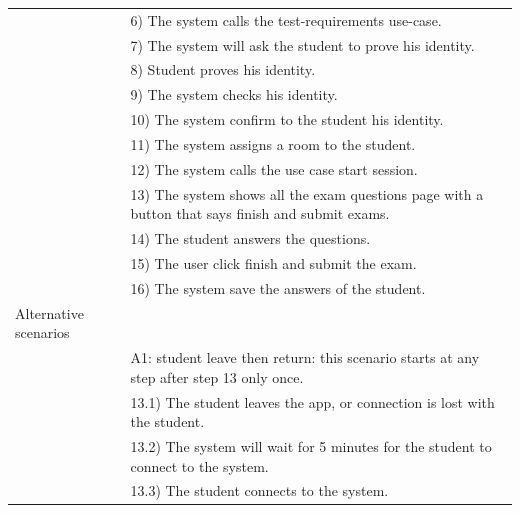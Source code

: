 \documentclass[]{uc2pfecaneva}
\begin{document}
\begin{table}[h]
\begin{tabularx}{\textwidth}{|l|X|}
		                      & 6) The system calls the test-requirements use-case.                                               \\
		                      & 7) The system will ask the student to prove his identity.                                         \\
		                      & 8) Student proves his identity.                                                                   \\
		                      & 9) The system checks his identity.                                                                \\
		                      & 10) The system confirm to the student his identity.                                               \\
		                      & 11) The system assigns a room to the student.                                                     \\
		                      & 12) The system calls the use case start session.                                                  \\
		                      & 13) The system shows all the exam questions page with a button that says finish and submit exams. \\
		                      & 14) The student answers the questions.                                                            \\
		                      & 15) The user click finish and submit the exam.                                                    \\
		                      & 16) The system save the answers of the student.                                                   \\ \hline
		Alternative scenarios &                                                                                                   \\
		                      & A1: student leave then return: this scenario starts at any step after step 13 only once.          \\
		                      & \hspace{4mm}13.1) The student leaves the app, or connection is lost with the student.             \\
		                      & \hspace{4mm}13.2) The system will wait for 5 minutes for the student to connect to the system.    \\
		                      & \hspace{4mm}13.3) The student connects to the system.                                             \\

\end{tabularx}
\end{table}
\end{document}
